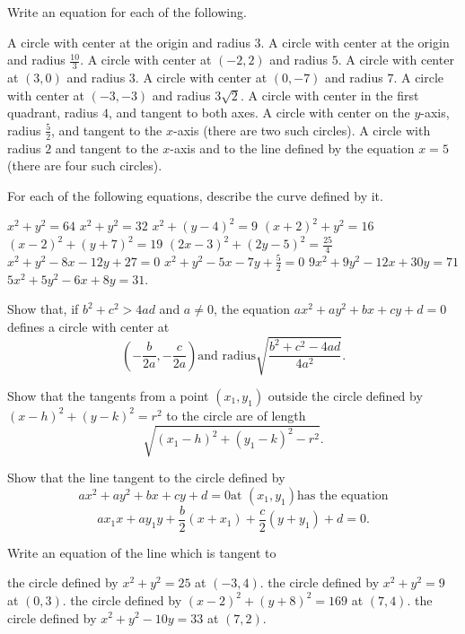 \begin{exercises}

Write an equation for each of the following.
\begin{exenum}
\sx
A circle with center at the origin and radius $3$.
\sx
A circle with center at the origin and radius $\frac{10}3$.
\sx
A circle with center at $(-2, 2)$ and radius $5$.
\sx
A circle with center at $(3, 0)$ and radius $3$.
\sx
A circle with center at $(0, -7)$ and radius $7$.
\sx
A circle with center at $(-3, -3)$ and radius $3\sqrt2$.
\sx
A circle with center in the first quadrant, radius $4$,
and tangent to both axes.
\sx
A circle with center on the $y$-axis, radius $\frac52$,
and tangent to the $x$-axis (there are two such circles).
\sx
A circle with radius $2$ and tangent to the $x$-axis
and to the line defined by the equation $x=5$
(there are four such circles).
\end{exenum}

For each of the following equations,
describe the curve defined by it.
\begin{exenum}
\sx
$x^2 + y^2 = 64$
\sx
$x^2 + y^2 = 32$
\sx
$x^2 + (y-4)^2 = 9$
\sx
$(x+2)^2 + y^2 = 16$
\sx
$(x-2)^2 + (y+7)^2 = 19$
\sx
$(2x-3)^2 + (2y-5)^2 = \frac{25}4$
\sx
$x^2 + y^2 - 8x - 12y + 27 = 0$
\sx
$x^2 + y^2 - 5x - 7y + \frac52 = 0$
\sx
$9x^2 + 9y^2 - 12x + 30y = 71$
\sx
$5x^2 + 5y^2 - 6x + 8y = 31$.
\end{exenum}

Show that, if $b^2 + c^2 > 4ad$ and $a \ne 0$, the equation
$ax^2 + ay^2 + bx + cy + d = 0$ defines a circle with
center at
\[
\left(-\frac{b}{2a}, -\frac{c}{2a} \right) 
\mbox{and radius}
\sqrt{\frac{b^2+c^2-4ad}{4a^2}}
.
\]

Show that the tangents from a point $(x_1,y_1)$
outside the circle defined by
$(x-h)^2 + (y-k)^2 = r^2$ to the circle are of length
\[
\sqrt{(x_1-h)^2 + (y_1-k)^2 - r^2}
.
\]

Show that the line tangent to the circle defined by
\[
ax^2 + ay^2 + bx + cy + d = 0 \mbox{at $(x_1,y_1)$
has the equation}
\]
\[
ax_1x + ay_1y + \frac b2(x+x_1) + \frac c2 (y+y_1) + d = 0
.
\]

Write an equation of the line which is tangent to
\begin{exenum}
\sx
the circle defined by $x^2 + y^2 = 25$ at $(-3,4)$.
\sx
the circle defined by $x^2 + y^2 = 9$ at $(0,3)$.
\sx
the circle defined by $(x-2)^2 + (y+8)^2 = 169$ at $(7,4)$.
\sx
the circle defined by $x^2 + y^2 - 10y = 33$ at $(7,2)$.
\end{exenum}


\end{exercises}
